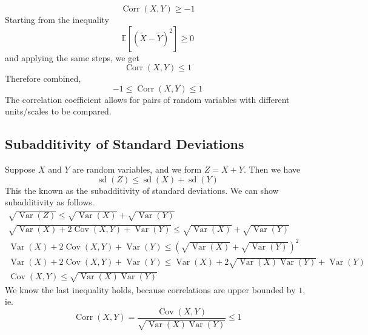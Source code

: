 \documentclass[11pt]{report} %
\begin{document}
\begin{equation}
\operatorname{Corr}\left(X, Y\right) \geq -1
\end{equation}
Starting from the inequality
\begin{equation}
\mathbb{E}\left[\left(\widetilde{X}-\widetilde{Y}\right)^{2}\right]\geq0
\end{equation}
and applying the same steps, we get
\begin{equation}
\operatorname{Corr}\left(X, Y\right) \leq 1
\end{equation}
Therefore combined,
\begin{equation}
-1 \leq \operatorname{Corr}\left(X, Y\right) \leq 1
\end{equation}
The correlation coefficient allows for pairs of random variables with different units/scales to be compared.

\subsection{Subadditivity of Standard Deviations}

Suppose $X$ and $Y$ are random variables, and we form $Z = X + Y$. Then we have
\begin{equation}
\operatorname{sd}\left(Z\right) \leq \operatorname{sd}\left(X\right) + \operatorname{sd}\left(Y\right)
\end{equation}
This the known as the subadditivity of standard deviations. We can show subadditivity as follows. 
\begin{gather}
\sqrt{\operatorname{Var}\left(Z\right)} \leq \sqrt{\operatorname{Var}\left(X\right)} + \sqrt{\operatorname{Var}\left(Y\right)} \\
\sqrt{\operatorname{Var}\left(X\right) + 2\operatorname{Cov}\left(X, Y\right) +\operatorname{Var}\left(Y\right)} \leq \sqrt{\operatorname{Var}\left(X\right)} + \sqrt{\operatorname{Var}\left(Y\right)} \\
\operatorname{Var}\left(X\right) + 2\operatorname{Cov}\left(X, Y\right) +\operatorname{Var}\left(Y\right) \leq \left(\sqrt{\operatorname{Var}\left(X\right)} + \sqrt{\operatorname{Var}\left(Y\right)}\right)^{2} \\
\operatorname{Var}\left(X\right) + 2\operatorname{Cov}\left(X, Y\right) +\operatorname{Var}\left(Y\right) \leq \operatorname{Var}\left(X\right) + 2\sqrt{\operatorname{Var}\left(X\right)\operatorname{Var}\left(Y\right)}
+ \operatorname{Var}\left(Y\right) \\
\operatorname{Cov}\left(X, Y\right) \leq \sqrt{\operatorname{Var}\left(X\right)\operatorname{Var}\left(Y\right)}
\end{gather}
We know the last inequality holds, because correlations are upper bounded by $1$, ie.
\begin{equation}
\operatorname{Corr}\left(X, Y\right) = \dfrac{\operatorname{Cov}\left(X, Y\right)}{\sqrt{\operatorname{Var}\left(X\right)\operatorname{Var}\left(Y\right)}} \leq 1
\end{equation}
\end{document}
